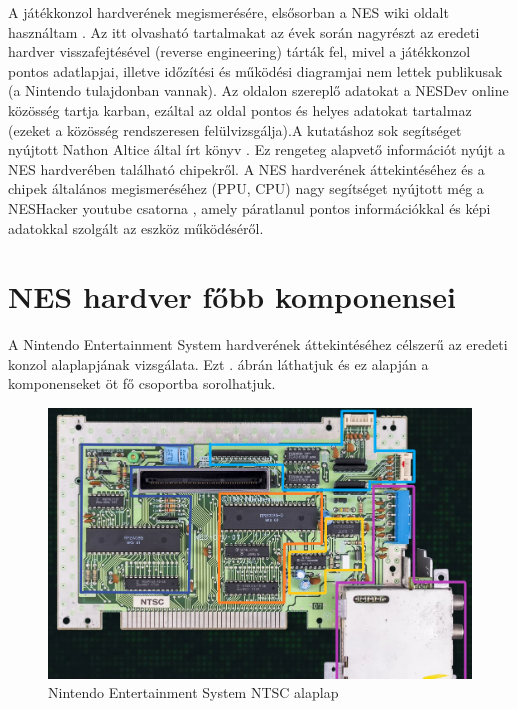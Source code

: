 A játékkonzol hardverének megismerésére, elsősorban a NES wiki oldalt használtam \cite{NESdev_wiki}. Az itt olvasható tartalmakat az évek során nagyrészt az eredeti hardver visszafejtésével (reverse engineering) tárták fel, mivel a játékkonzol pontos adatlapjai, illetve időzítési és működési diagramjai nem lettek publikusak (a Nintendo tulajdonban vannak). Az oldalon szereplő adatokat a NESDev online közösség tartja karban, ezáltal az oldal pontos és helyes adatokat tartalmaz (ezeket a közösség rendszeresen felülvizsgálja).A kutatáshoz sok segítséget nyújtott Nathon Altice által írt könyv \cite{IAmError}. Ez rengeteg alapvető információt nyújt a NES hardverében található chipekről. A NES hardverének áttekintéséhez és a chipek általános megismeréséhez (PPU, CPU) nagy segítséget nyújtott még a NESHacker youtube csatorna \cite{Neshacker_youtube}, amely páratlanul pontos információkkal és képi adatokkal szolgált az eszköz működéséről. 


\section{NES hardver főbb komponensei}
\label{sec:NES-motherboard}

A Nintendo Entertainment System hardverének áttekintéséhez célszerű az eredeti konzol alaplapjának vizsgálata. Ezt . ábrán láthatjuk és ez alapján a komponenseket öt fő csoportba sorolhatjuk.

\begin{figure}[H]
	\centering
	\includegraphics[width=150mm, keepaspectratio]{figures/NES-motherboard-lines}
	\caption{Nintendo Entertainment System NTSC alaplap \cite{NES_hardware}}
	\label{fig:NES-Motherboard}
\end{figure}

